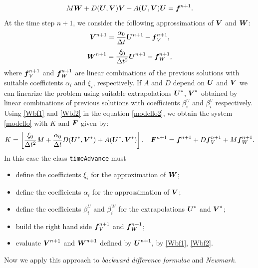 \documentclass[english,a4paper]{article}
\newcommand{\Ubf}{\text{\mbox{\boldmath $U$}}}
\newcommand{\Abf}{\text{\mbox{\boldmath $W$}}}
\newcommand{\fbf}{\text{\mbox{\boldmath $f$}}}
\newcommand{\Fbf}{\text{\mbox{\boldmath $F$}}}
\newcommand{\Wbf}{\text{\mbox{\boldmath $V$}}}
\begin{document}
\begin{equation}\label{modello2}
M\Abf+D(\Ubf, \Wbf)\Wbf+ A(\Ubf,\Wbf)\Ubf=\fbf^{n+1}.
\end{equation}
At the time step $n+1$, we consider the following approssimations of
$\Wbf$ and $\Abf$:
\begin{equation}\label{Wbf1}
\Wbf^{n+1}=\frac{\alpha_0}{\Delta t}\Ubf^{n+1}-\fbf_V^{n+1},
\end{equation}
\begin{equation}\label{Wbf2}
\Abf^{n+1}=\frac{\xi_0}{\Delta t^2}\Ubf^{n+1}-\fbf_W^{n+1},
\end{equation}
where $\fbf_V^{n+1}$ and $\fbf_W^{n+1}$ are  linear combinations of the previous  solutions with
suitable coefficients $\alpha_i$ and $\xi_i$, respectively.
If  $A$ and $D$ depend on  $\Ubf$ and $\Wbf$ we can linearize the
problem using suitable extrapolations $\Ubf^*$, $\Wbf^*$ obtained
by linear combinations of previous solutions with coefficients
$\beta_i^U$ and $\beta_i^V$ respectively.\\
Using \eqref{Wbf1} and \eqref{Wbf2} in the equation \eqref{modello2},
we obtain the system   \eqref{modello} with $K$ and $\Fbf$ given by:
\begin{eqnarray*}
 &K=\left[\frac{\xi_0}{\Delta t^2} M +\frac{\alpha_0}{\Delta
     t}D(\Ubf^*, \Wbf^*)+A(\Ubf^*, \Wbf^*)\right],&
\Fbf^{n+1}=\fbf^{n+1}+D\fbf_V^{n+1}+M\fbf_W^{n+1}.
\end{eqnarray*}
In this case the class \verb"timeAdvance" must
\begin{itemize}
\item define the coefficients $\xi_i$ for the approximation of $\Abf$;
\item define the coefficients $\alpha_i$ for the approssimation of $\Wbf$;
\item define the coefficients $\beta_i^U$ and $\beta_i^W$ for  the extrapolations  $\Ubf^{*}$ and $\Wbf^{*}$;
\item build the right hand side  $\fbf_V^{n+1}$ and $\fbf_W^{n+1}$;
\item evaluate  $\Wbf^{n+1}$ and $\Abf^{n+1}$ defined by $\Ubf^{n+1}$,
  by \eqref{Wbf1}, \eqref{Wbf2}.
\end{itemize}
Now we apply this approach to {\sl backward difference formulae } and
{\sl Newmark}.
\end{document}
